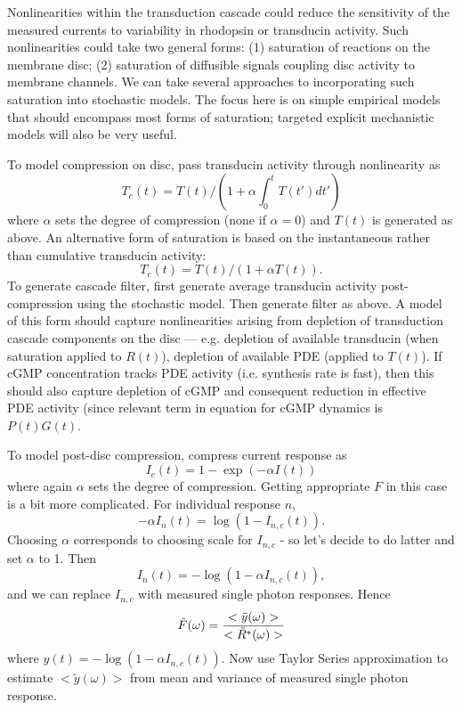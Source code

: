 \documentclass[12pt]{article}
\begin{document}
Nonlinearities within the transduction cascade could reduce the sensitivity of the measured currents to variability in rhodopsin or transducin activity.  Such nonlinearities could take two general forms: (1) saturation of reactions on the membrane disc; (2) saturation of diffusible signals coupling disc activity to membrane channels.  We can take several approaches to incorporating such saturation into stochastic models.  The focus here is on simple empirical models that should encompass most forms of saturation; targeted explicit mechanistic models will also be very useful. 

To model compression on disc, pass transducin activity through nonlinearity as
\begin{equation}
T_c(t) = T(t) / (1 + \alpha \int_0^t T(t') dt')
\end{equation}
where $\alpha$ sets the degree of compression (none if $\alpha = 0$) and $T(t)$ is generated as above.  An alternative form of saturation is based on the instantaneous rather than cumulative transducin activity:
\begin{equation}
T_c(t) = T(t) / (1 + \alpha T(t)).
\end{equation}
To generate cascade filter, first generate average transducin activity post-compression using the stochastic model.  Then generate filter as above.  A model of this form should capture nonlinearities arising from depletion of transduction cascade components on the disc --- e.g. depletion of available transducin (when saturation applied to $R(t)$), depletion of available PDE (applied to $T(t)$).  If cGMP concentration tracks PDE activity (i.e. synthesis rate is fast), then this should also capture depletion of cGMP and consequent reduction in effective PDE activity (since relevant term in equation for cGMP dynamics is $P(t) G(t)$.  

To model post-disc compression, compress current response as
\begin{equation}
I_c(t) =  1 - \exp(- \alpha I(t))
\end{equation}
where again $\alpha$ sets the degree of compression.  Getting appropriate $F$ in this case is a bit more complicated.  For individual response $n$, 
\begin{equation}
- \alpha I_n(t) = \log(1 - I_{n,c}(t)).
\end{equation}
Choosing $\alpha$ corresponds to choosing scale for $I_{n,c}$ - so let's decide to do latter and set $\alpha$ to 1.  Then 
\begin{equation}
I_n(t) = - \log(1 - \alpha I_{n,c}(t)),
\end{equation}
and we can replace $I_{n,c}$ with measured single photon responses.  Hence
\begin{equation}
\tilde F(\omega) = {{<\tilde y(\omega)>} \over {<\tilde R^*(\omega)>}}
\end{equation}
where $y(t) = -\log(1-\alpha I_{n,c}(t))$.  Now use Taylor Series approximation to estimate $<\tilde y(\omega)>$ from mean and variance of measured single photon response.  
\end{document}
